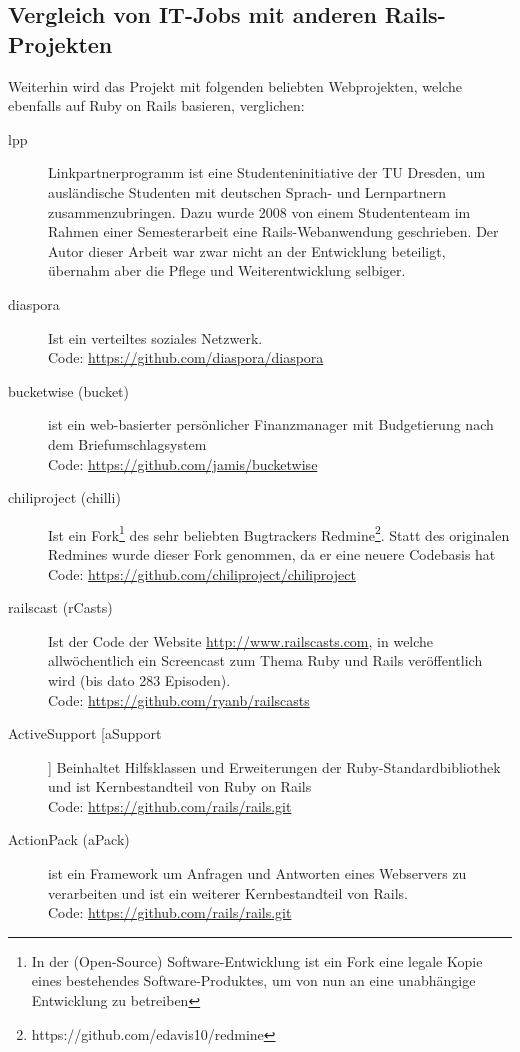 \subsection{Vergleich von IT-Jobs mit anderen Rails-Projekten}
Weiterhin wird das Projekt mit folgenden beliebten Webprojekten, welche ebenfalls auf Ruby on Rails basieren, verglichen:
\begin{description}
\item[lpp] Linkpartnerprogramm ist eine Studenteninitiative der TU Dresden, um ausländische Studenten mit deutschen Sprach- und Lernpartnern zusammenzubringen. Dazu wurde 2008 von einem Studententeam im Rahmen einer Semesterarbeit eine Rails-Webanwendung geschrieben. Der Autor dieser Arbeit war zwar nicht an der Entwicklung beteiligt, übernahm aber die Pflege und Weiterentwicklung selbiger.
 \item[diaspora] Ist ein verteiltes soziales Netzwerk. \\
 Code: \url{https://github.com/diaspora/diaspora}
 \item[bucketwise (bucket)] ist ein web-basierter persönlicher Finanzmanager mit Budgetierung nach dem Briefumschlagsystem\\
 Code: \url{https://github.com/jamis/bucketwise}
 \item[chiliproject (chilli)] Ist ein Fork\footnote{In der (Open-Source) Software-Entwicklung ist ein Fork eine legale Kopie eines bestehendes Software-Produktes, um von nun an eine unabhängige Entwicklung zu betreiben} des sehr beliebten Bugtrackers Redmine\footnote{https://github.com/edavis10/redmine}. Statt des originalen Redmines wurde dieser Fork genommen, da er eine neuere Codebasis hat\\
 Code: \url{https://github.com/chiliproject/chiliproject}
 \item[railscast (rCasts)] Ist der Code der Website \url{http://www.railscasts.com}, in welche allwöchentlich ein Screencast zum Thema Ruby und Rails veröffentlich wird (bis dato 283 Episoden).\\
 Code: \url{https://github.com/ryanb/railscasts} 
 \item[ActiveSupport [aSupport]] Beinhaltet Hilfsklassen und Erweiterungen der Ruby-Standardbibliothek und ist Kernbestandteil von Ruby on Rails \\
 Code: \url{https://github.com/rails/rails.git}
 \item[ActionPack (aPack)]  ist ein Framework um Anfragen und Antworten eines Webservers zu verarbeiten und ist ein weiterer Kernbestandteil von Rails.\\
 Code: \url{https://github.com/rails/rails.git}
\end{description}

